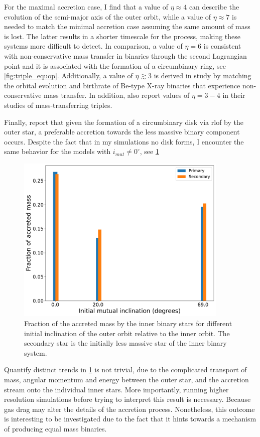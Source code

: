 For the maximal accretion case, I find that a value of $\eta \approx 4$ can describe the evolution of the semi-major axis of the outer orbit, while a value of $\eta \approx 7$ is needed to match the minimal accretion case assuming the same amount of mass is lost. The latter results in a shorter timescale for the process, making these systems more difficult to detect. In comparison, a value of $\eta = 6$ is consistent with non-conservative mass transfer in binaries through the second Lagrangian point \citep{flannery1977origin,portegies1995formation} and it is associated with the formation of a circumbinary ring, see \cref{fig:triple_equop}. Additionally, a value of $\eta \gtrsim 3$ is derived in \cite{portegies1995formation} study by matching the orbital evolution and birthrate of Be-type X-ray binaries that experience non-conservative mass transfer. In addition, \cite{de2014evolution, zwart2019triple} 
 also report values of $\eta = 3-4$ in their studies of mass-transferring triples. 

Finally, \cite{zwart2019triple,leigh2020mergers} report that given the formation of a circumbinary disk via \ac{rlof} by the outer star, a preferable accretion towards the less massive binary component occurs. Despite the fact that in my simulations no disk forms, I encounter the same behavior for the models with $i_{mut} \neq 0^{\circ}$, see \cref{fig:inclination_binary_eff}
\begin{figure}[H]
    \centering
    \includegraphics[width=0.9\textwidth]{Thesis/graphs/inclination_case/incliantion_binary_acc_efficiency.pdf}
    \caption{Fraction of the accreted mass by the inner binary stars for different initial inclination of the outer orbit relative to the inner orbit. The secondary star is the initially less massive star of the inner binary system.}
    \label{fig:inclination_binary_eff}
\end{figure}
Quantify distinct trends in \cref{fig:inclination_binary_eff} is not trivial, due to the complicated transport of mass, angular momentum and energy between the outer star, and the accretion stream onto the individual inner stars. More importantly, running higher resolution simulations before trying to interpret this result is necessary. Because gas drag may alter the details of the accretion process. Nonetheless, this outcome is interesting to be investigated due to the fact that it hints towards a mechanism of producing equal mass binaries. 
